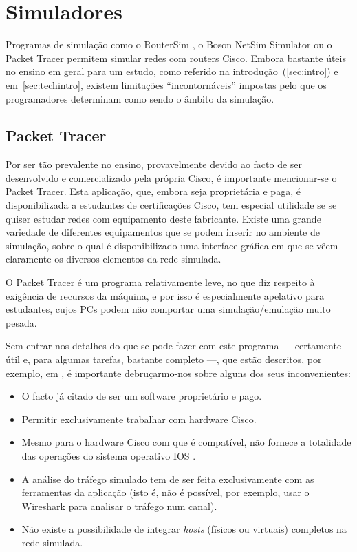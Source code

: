 \section{Simuladores}

Programas de simulação como o RouterSim \cite{routersimsite}, o Boson NetSim Simulator \cite{bosonnetsimsite} ou o Packet Tracer \cite{packettrackersite} permitem simular redes com routers Cisco. Embora bastante úteis no ensino em geral para um estudo, como referido na introdução~(\ref{sec:intro}) e em~\ref{sec:techintro}, existem limitações ``incontornáveis'' impostas pelo que os programadores determinam como sendo o âmbito da simulação.

\subsection{Packet Tracer}

Por ser tão prevalente no ensino, provavelmente devido ao facto de ser desenvolvido e comercializado pela própria Cisco, é importante mencionar-se o Packet Tracer. Esta aplicação, que, embora seja proprietária e paga, é disponibilizada a estudantes de certificações Cisco, tem especial utilidade se se quiser estudar redes com equipamento deste fabricante. Existe uma grande variedade de diferentes equipamentos que se podem inserir no ambiente de simulação, sobre o qual é disponibilizado uma interface gráfica em que se vêem claramente os diversos elementos da rede simulada.

O Packet Tracer é um programa relativamente leve, no que diz respeito à exigência de recursos da máquina, e por isso é especialmente apelativo para estudantes, cujos PCs podem não comportar uma simulação/emulação muito pesada.

Sem entrar nos detalhes do que se pode fazer com este programa --- certamente útil e, para algumas tarefas, bastante completo ---, que estão descritos, por exemplo, em \cite{ZHANG2012504}, é importante debruçarmo-nos sobre alguns dos seus inconvenientes:
\begin{itemize}
	\item O facto já citado de ser um software proprietário e pago.
	\item Permitir exclusivamente trabalhar com hardware Cisco.
	\item Mesmo para o hardware Cisco com que é compatível, não fornece a totalidade das operações do sistema operativo IOS \cite{ioswikipedia}.
	\item A análise do tráfego simulado tem de ser feita exclusivamente com as ferramentas da aplicação (isto é, não é possível, por exemplo, usar o Wireshark \cite{lamping2004wireshark} para analisar o tráfego num canal).
	\item Não existe a possibilidade de integrar \emph{hosts} (físicos ou virtuais) completos na rede simulada.
\end{itemize}


